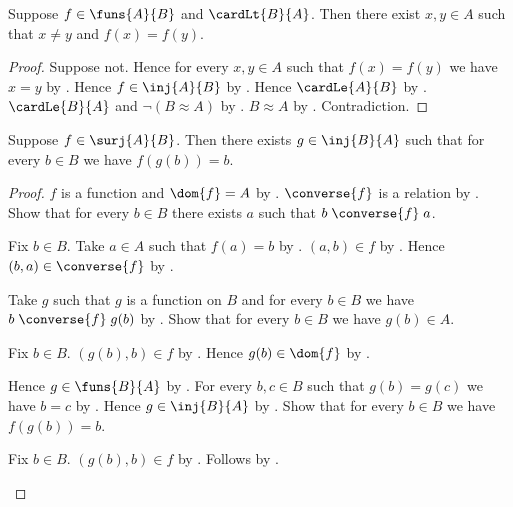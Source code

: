 \begin{theorem}\label{cardinal_pigeonhole}
    Suppose $f\in\funs{A}{B}$ and $\cardLt{B}{A}$.
    Then there exist $x,y\in A$ such that $x\neq y$ and $f(x)=f(y)$.
\end{theorem}
\begin{proof}
    Suppose not.
    Hence for every $x,y\in A$ such that $f(x)=f(y)$ we have $x=y$
        by \auto.
    Hence $f\in\inj{A}{B}$ by .
    Hence $\cardLe{A}{B}$ by .
    $\cardLe{B}{A}$ and $\lnot(B\approx A)$
        by .
    $B\approx A$ by
        .
    Contradiction.
\end{proof}

\begin{theorem}\label{surjection_has_injective_section}
    Suppose $f\in\surj{A}{B}$.
    Then there exists $g\in\inj{B}{A}$ such that for every $b\in B$
        we have $f(g(b))=b$.
\end{theorem}
\begin{proof}
    $f$ is a function and $\dom{f}=A$
        by .
    $\converse{f}$ is a relation by .
    Show that for every $b\in B$ there exists $a$ such that
        $b\mathrel{\converse{f}}a$.
    \begin{subproof}
        Fix $b\in B$.
        Take $a\in A$ such that $f(a)=b$ by .
        $(a,b)\in f$ by .
        Hence $(b,a)\in\converse{f}$ by .
    \end{subproof}
    Take $g$ such that $g$ is a function on $B$ and for every $b\in B$
        we have $b\mathrel{\converse{f}}g(b)$
        by .
    Show that for every $b\in B$ we have $g(b)\in A$.
    \begin{subproof}
        Fix $b\in B$.
        $(g(b),b)\in f$ by .
        Hence $g(b)\in\dom{f}$ by .
    \end{subproof}
    Hence $g\in\funs{B}{A}$ by .
    For every $b,c\in B$ such that $g(b)=g(c)$ we have $b=c$
        by .
    Hence $g\in\inj{B}{A}$ by .
    Show that for every $b\in B$ we have $f(g(b))=b$.
    \begin{subproof}
        Fix $b\in B$.
        $(g(b),b)\in f$ by .
        Follows by .
    \end{subproof}
\end{proof}

